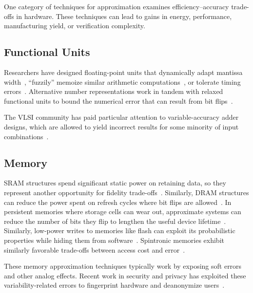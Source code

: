 One category of techniques for approximation examines efficiency--accuracy
trade-offs in hardware.
These techniques can lead to gains in energy, performance, manufacturing
yield, or verification complexity.

\subsection{Functional Units}

Researchers have designed floating-point units
that dynamically adapt mantissa width~\cite{bitwidthred, hierarchfpu}, ``fuzzily'' memoize
similar arithmetic computations~\cite{fuzzymemo}, or tolerate timing
errors~\cite{kumarhpca, hizli, metafunctions}.
Alternative number
representations work in tandem with relaxed functional units to bound the
numerical error that can result from bit flips~\cite{stanleymarbell}.

The VLSI community has paid particular attention to variable-accuracy adder
designs, which are allowed to yield incorrect results for some minority of
input combinations~\cite{uva-adder, palem-adders, impact, adder-metrics,
configurable-adder, adder-iccad13, adder-tcad, adder-optimal, adder-dac12,
adder-isic09, adder-date08}.

\subsection{Memory}

SRAM
structures spend significant static power on retaining data, so they represent
another opportunity for fidelity trade-offs~\cite{hybrid-sram, sramerrors,
partially-forgetful}. Similarly,
DRAM structures can reduce the power spent on refresh cycles where bit flips
are allowed~\cite{flikker, sparkk}.
In persistent memories where storage cells can wear out, approximate systems
can reduce the number of bits they flip to lengthen the useful device
lifetime~\cite{fang-pcm}.
Similarly, low-power writes to memories like flash can exploit its
probabilistic properties while hiding them from software~\cite{halfwits,
powerfade, flash-retention-relax}.
Spintronic memories exhibit similarly favorable trade-offs between access cost
and error~\cite{spintronic-approx}.

These memory approximation techniques typically
work by exposing
soft errors and other analog effects.
Recent work in security and privacy has exploited these variability-related
errors to fingerprint hardware and deanonymize users~\cite{deanondram}.

